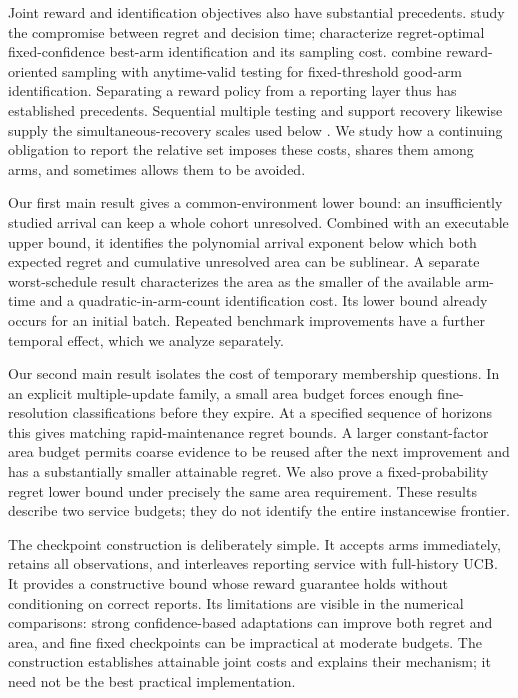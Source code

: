 Joint reward and identification objectives also have substantial precedents.
\citet{degenne2019} study the compromise between regret and decision time;
\citet{yang2026} characterize regret-optimal fixed-confidence best-arm
identification and its sampling cost. \citet{cho2025} combine reward-oriented
sampling with anytime-valid testing for fixed-threshold good-arm
identification. Separating a reward policy from a reporting layer thus has
established precedents. Sequential multiple testing
and support recovery likewise supply the simultaneous-recovery scales used
below \citep{malloy2014,jamieson2018}. We study how a continuing obligation to
report the relative set imposes these costs, shares them among arms, and
sometimes allows them to be avoided.

Our first main result gives a common-environment lower bound: an insufficiently
studied arrival can keep a whole cohort unresolved. Combined with an executable
upper bound, it identifies the polynomial arrival exponent below which both
expected regret and cumulative unresolved area can be sublinear. A separate
worst-schedule result characterizes the area as the smaller of the available
arm-time and a quadratic-in-arm-count identification cost. Its lower bound
already occurs for an initial batch. Repeated benchmark improvements have a
further temporal effect, which we analyze separately.

Our second main result isolates the cost of temporary membership questions.
In an explicit multiple-update family, a small area budget forces enough
fine-resolution classifications before they expire. At a specified sequence
of horizons this gives matching rapid-maintenance regret bounds. A larger
constant-factor area budget permits coarse evidence to be reused after the
next improvement and has a substantially smaller attainable regret. We also
prove a fixed-probability regret lower bound under precisely the same area
requirement. These results describe two service budgets; they do not identify
the entire instancewise frontier.

The checkpoint construction is deliberately simple. It accepts arms immediately,
retains all observations, and interleaves reporting service with full-history
UCB. It provides a constructive bound whose reward guarantee holds without
conditioning on correct reports. Its limitations are visible in the numerical
comparisons: strong confidence-based adaptations can improve both regret and
area, and fine fixed checkpoints can be impractical at moderate budgets.
The construction establishes attainable joint costs and explains their
mechanism; it need not be the best practical implementation.
